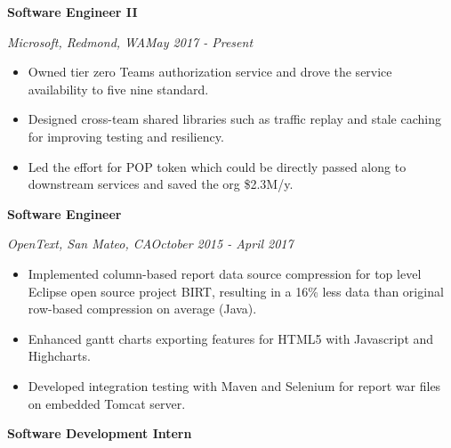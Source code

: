 \documentclass[3pt]{article}
\newenvironment{changemargin}[2]{%
  \begin{list}{}{%
    \setlength{\topsep}{0pt}%
    \setlength{\leftmargin}{#1}%
    \setlength{\rightmargin}{#2}%
    \setlength{\listparindent}{\parindent}%
    \setlength{\itemindent}{\parindent}%
    \setlength{\parsep}{\parskip}%
  }%
  \item[]}{\end{list}
}
\newenvironment{body} {
	\vspace*{-16pt}
	\begin{changemargin}{-0.25in}{-0.5in}
  }	
	{\end{changemargin}
}
\begin{document}
\begin{body}
	\vspace{17pt}
	
   \textbf{Software Engineer II} \\
   \vspace{1pt}

    \emph{Microsoft, Redmond, WA}\hfill \emph{May 2017 - Present}\\
     \begin{itemize} \itemsep -0.5pt
    \item {Owned tier zero Teams authorization service and drove the service availability to five nine standard.}
     \item {Designed cross-team shared libraries such as traffic replay and stale caching for improving testing and resiliency.} 
     \item {Led the effort for POP token which could be directly passed along to downstream services and saved the org \$2.3M/y.} 
     \end{itemize}

    \textbf{Software Engineer} \\
   \vspace{1pt}

    \emph{OpenText, San Mateo, CA}\hfill \emph{October 2015 - April 2017}\\
     \begin{itemize} \itemsep -0.5pt
    \item{Implemented column-based report data source compression for top level Eclipse open source project BIRT, resulting in a 16\% less data than original row-based compression on average (Java).}
     \item {Enhanced gantt charts exporting features for HTML5 with Javascript and Highcharts. } 
     \item {Developed integration testing with Maven and Selenium for report war files on embedded Tomcat server. } 
       \end{itemize}
	
   \vspace{5pt}

    \textbf{Software Development Intern} \\


\end{body}
\end{document}

